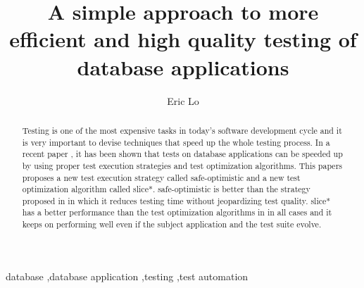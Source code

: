 \documentclass[authoryear,preprint,12pt]{elsarticle}
\begin{document}
\begin{frontmatter}



\title{A simple approach to more efficient and high quality testing of database applications}


\author{Eric Lo}

\address{Department of Computing, Hong Kong Polytechnic University}
\address{ericlo@comp.polyu.edu.hk}

\begin{abstract}
Testing is one of the most expensive tasks in today's software development cycle 
and it is very important to devise techniques that speed up the whole testing process.
In a recent paper \cite{cidr05},
it has been shown that tests on database applications can be speeded up by using 
proper test execution strategies and test optimization algorithms.
This papers proposes a new 
test execution strategy called {\sc safe-optimistic}
and a new test optimization algorithm called {\sc slice*}.
{\sc safe-optimistic} is better than the strategy proposed in \cite{cidr05}
in which it reduces testing time without jeopardizing test quality.
{\sc slice*} has a better performance than the test optimization algorithms in \cite{cidr05} in all cases
and it keeps on performing well even if the subject application and the test suite evolve.
\end{abstract}

\begin{keyword}
database \sep database application \sep testing \sep test automation



\end{keyword}

\end{frontmatter}
\end{document}

